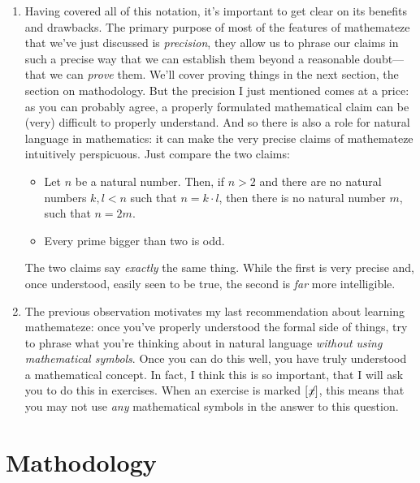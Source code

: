 \begin{enumerate}[{\thesection}.1]
		\item Having covered all of this notation, it's important to get clear on its benefits and drawbacks. The primary purpose of most of the features of mathemateze that we've just discussed is \emph{precision}, they allow us to phrase our claims in such a precise way that we can establish them beyond a reasonable doubt---that we can \emph{prove} them. We'll cover proving things in the next section, the section on mathodology. But the precision I just mentioned comes at a price: as you can probably agree, a properly formulated mathematical claim can be (very) difficult to properly understand. And so there is also a role for natural language in mathematics: it can make the very precise claims of mathemateze intuitively perspicuous. Just compare the two claims:
		
		\begin{itemize}
		
			\item Let $n$ be a natural number. Then, if $n>2$ and there are no natural numbers $k,l<n$ such that $n=k\cdot l$, then there is no natural number $m$, such that $n=2m$.
			
			\item Every prime bigger than two is odd.
		
		\end{itemize}
		
The two claims say \emph{exactly} the same thing. While the first is very precise and, once understood, easily seen to be true, the second is \emph{far} more intelligible. 

	\item The previous observation motivates my last recommendation about learning mathemateze: once you've properly understood the formal side of things, try to phrase what you're thinking about in natural language \emph{without using mathematical symbols}. Once you can do this well, you have truly understood a mathematical concept. In fact, I think this is so important, that I will ask you to do this in exercises. When an exercise is marked $[\not\hspace{-.5ex}x]$, this means that you may not use \emph{any} mathematical symbols in the answer to this question.
		
	\end{enumerate}
		
	\section{Mathodology}


